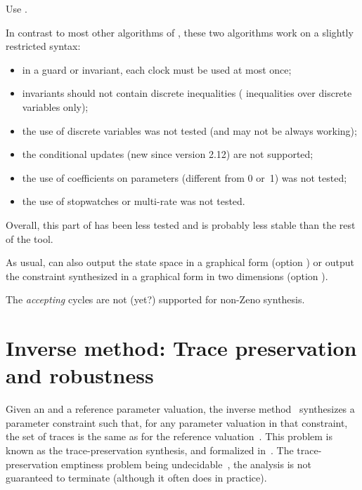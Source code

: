 	      Use .

\begin{becareful}[restrictions]
	In contrast to most other algorithms of \imitator{}, these two algorithms work on a slightly restricted syntax:
	\begin{itemize}
		\item in a guard or invariant, each clock must be used at most once;
		\item invariants should not contain discrete inequalities (\ie{} inequalities over discrete variables only);
		\item the use of discrete variables was not tested (and may not be always working);
		\item the conditional updates (new since version 2.12) are not supported;
		\item the use of coefficients on parameters (different from 0 or~1) was not tested;
		\item the use of stopwatches or multi-rate was not tested.
	\end{itemize}
	Overall, this part of \imitator{} has been less tested and is probably less stable than the rest of the tool.
\end{becareful}

As usual, \imitator{} can also
output the state space in a graphical form (option )
or
output the constraint synthesized in a graphical form in two dimensions (option ).

\begin{remark}
	The \emph{accepting} cycles are not (yet?) supported for non-Zeno synthesis.
\end{remark}



\section{Inverse method: Trace preservation and robustness}\label{ss:mode:IM}

Given an \NIPTA{} and a reference parameter valuation, the inverse method~\IM{} synthesizes a parameter constraint such that, for any parameter valuation in that constraint, the set of traces is the same as for the reference valuation~\cite{ACEF09}.
This problem is known as the trace-preservation synthesis, and formalized in~\cite{AM15}.
The trace-preservation emptiness problem being undecidable~\cite{AM15}, the analysis is not guaranteed to terminate (although it often does in practice).

